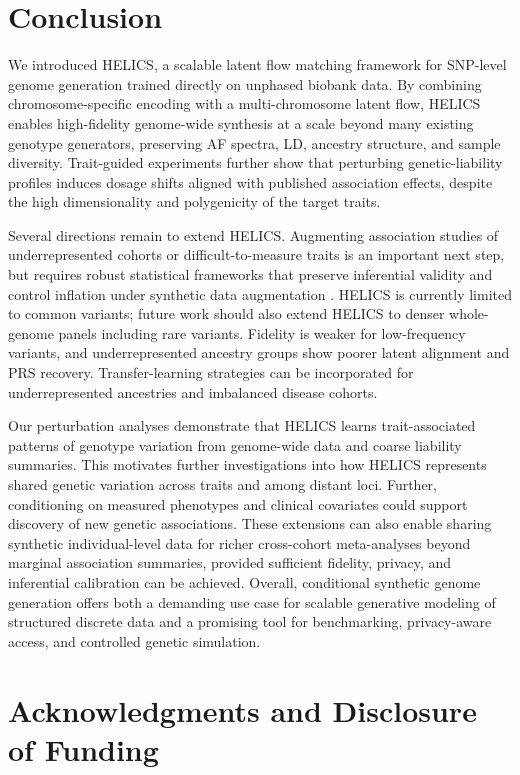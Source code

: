 \documentclass{article}
\begin{document}
\section{Conclusion}

We introduced HELICS, a scalable latent flow matching framework for SNP-level genome generation trained directly on unphased biobank data. By combining chromosome-specific encoding with a multi-chromosome latent flow, HELICS enables high-fidelity genome-wide synthesis at a scale beyond many existing genotype generators, preserving AF spectra, LD, ancestry structure, and sample diversity. Trait-guided experiments further show that perturbing genetic-liability profiles induces dosage shifts aligned with published association effects, despite the high dimensionality and polygenicity of the target traits.

Several directions remain to extend HELICS. Augmenting association studies of underrepresented cohorts or difficult-to-measure traits is an important next step, but requires robust statistical frameworks that preserve inferential validity and control inflation under synthetic data augmentation \cite{abdel2026harnessing}. HELICS is currently limited to common variants; future work should also extend HELICS to denser whole-genome panels including rare variants. Fidelity is weaker for low-frequency variants, and underrepresented ancestry groups show poorer latent alignment and PRS recovery. Transfer-learning strategies can be incorporated for underrepresented ancestries and imbalanced disease cohorts. 

Our perturbation analyses demonstrate that HELICS learns trait-associated patterns of genotype variation from genome-wide data and coarse liability summaries. This motivates further investigations into how HELICS represents shared genetic variation across traits and among distant loci. Further, conditioning on measured phenotypes and clinical covariates could support discovery of new genetic associations. These extensions can also enable sharing synthetic individual-level data for richer cross-cohort meta-analyses beyond marginal association summaries, provided sufficient fidelity, privacy, and inferential calibration can be achieved. Overall, conditional synthetic genome generation offers both a demanding use case for scalable generative modeling of structured discrete data and a promising tool for benchmarking, privacy-aware access, and controlled genetic simulation.

\section*{Acknowledgments and Disclosure of Funding}
\end{document}
